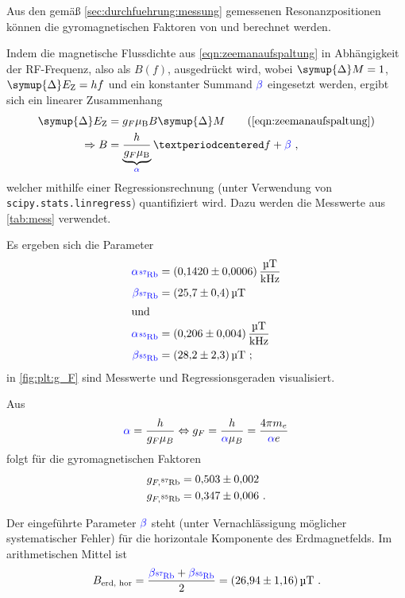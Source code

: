 Aus den gemäß \autoref{sec:durchfuehrung:messung} gemessenen Resonanzpositionen
können die gyromagnetischen Faktoren von  und  berechnet werden.


Indem die magnetische Flussdichte aus \autoref{eqn:zeemanaufspaltung}
in Abhängigkeit der RF-Frequenz, also als $B(f)$, ausgedrückt wird,
wobei $\symup{\Delta} M = 1$, $\symup{\Delta} E_\text{Z} = hf$ und ein konstanter Summand ${\color{blue} \beta}$ eingesetzt werden,
ergibt sich ein linearer Zusammenhang
\begin{align*}
    \symup{\Delta} E_\text{Z} &= g_F \mu_\text{B} B \symup{\Delta} M
    \tag{\ref{eqn:zeemanaufspaltung}} \\
    \Rightarrow
    B &= \underbrace{\frac{h}{g_F \mu_\text{B}}}_{\coloralpha} · f
    + \colorbeta \ ,
\end{align*}
welcher mithilfe einer Regressionsrechnung
(unter Verwendung von \texttt{scipy.stats.linregress})
quantifiziert wird.
Dazu werden die Messwerte aus \autoref{tab:mess} verwendet.

Es ergeben sich die Parameter
\begin{align*}
    {\color{blue} \alpha_{\Rb{87}}} &= \SI{0.1420 \pm 0.0006}{\micro\tesla\per\kilo\hertz} \\
    {\color{blue} \beta_{\Rb{87}}} &= \SI{25.7 \pm 0.4}{\micro\tesla} \\
    \intertext{und}
    {\color{blue} \alpha_{\Rb{85}}} &= \SI{0.206 \pm 0.004}{\micro\tesla\per\kilo\hertz} \\
    {\color{blue} \beta_{\Rb{85}}} &= \SI{28.2 \pm 2.3}{\micro\tesla} \ ;
\end{align*}
in \autoref{fig:plt:g_F} sind Messwerte und Regressionsgeraden visualisiert.

Aus
\[
    {\color{blue} \alpha} = \frac{h}{g_F \mu_B}
    \Leftrightarrow
    g_F = \frac{h}{{\color{blue} \alpha} \mu_B}
    = \frac{4 \pi m_e}{{\color{blue} \alpha} e}
\]
folgt für die gyromagnetischen Faktoren
\begin{align*}
    g_{F, \Rb{87}} &= \num{0.503 \pm 0.002} \\
    g_{F, \Rb{85}} &= \num{0.347 \pm 0.006} \ .
\end{align*}


Der eingeführte Parameter $\color{blue} \beta$ steht
(unter Vernachlässigung möglicher systematischer Fehler)
für die horizontale Komponente des Erdmagnetfelds.
Im arithmetischen Mittel ist
\[
    B_\text{erd, hor}
    = \frac{{\color{blue} \beta_{\Rb{87}}} + \color{blue} \beta_{\Rb{85}}}{2}
    = \SI{26.94 \pm 1.16}{\micro\tesla} \ .
\]

